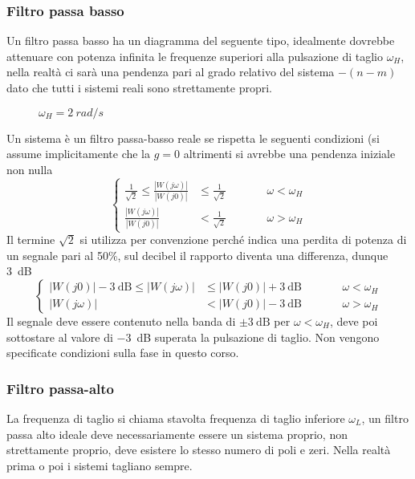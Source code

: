 \subsubsection{Filtro passa basso}
Un filtro passa basso ha un diagramma del seguente tipo, idealmente dovrebbe
attenuare con potenza infinita le frequenze superiori alla
pulsazione di taglio $\omega_H$, nella realtà ci sarà una pendenza pari al
grado relativo del sistema $-(n-m)$ dato che tutti i sistemi reali sono
strettamente propri.
\begin{figure}[h]
\centering
{}
\caption{$\omega_H = \SI{2}{rad/s}$}
\end{figure}

Un sistema è un filtro passa-basso reale se rispetta le seguenti condizioni (si
assume implicitamente che la $g=0$ altrimenti si avrebbe una pendenza iniziale
non nulla
$$
\left\{
\begin{aligned}
 \frac{1}{\sqrt{2}} \leq \frac{|W(j\omega)|}{|W(j0)|} &\leq \frac{1}{\sqrt{2}}
& &\qquad \omega<\omega_H \\
\frac{|W(j\omega)|}{|W(j0)|} &< \frac{1}{\sqrt{2}} & &\qquad \omega> \omega_H
\end{aligned}
\right.
$$
Il termine $\sqrt{2}$ si utilizza per convenzione perché indica una perdita di
potenza di un segnale pari al 50\%, sul decibel il rapporto diventa una
differenza, dunque \SI{3}{\deci\bel}
$$
\left\{
\begin{aligned}
|W(j0)| - \SI{3}{\deci\bel} \leq |W(j\omega)| &\leq |W(j0)| + \SI{3}{\deci\bel}
 & &\qquad \omega < \omega_H \\
 |W(j\omega)| &<  |W(j0)| - \SI{3}{\deci\bel} &  &\qquad \omega > \omega_H
\end{aligned}
\right.
$$
Il segnale deve essere contenuto nella banda di $\pm\SI{3}{\deci\bel}$ per
$\omega<\omega_H$, deve poi sottostare al valore di \SI{-3}{\deci\bel} superata
la pulsazione di taglio. Non vengono specificate condizioni sulla fase in
questo corso.

\newpage
\subsubsection{Filtro passa-alto}
La frequenza di taglio si chiama stavolta frequenza di taglio inferiore
$\omega_L$, un filtro passa alto ideale deve necessariamente essere un sistema
proprio, non strettamente proprio, deve esistere lo stesso numero di poli e
zeri.
Nella realtà prima o poi i sistemi tagliano sempre.

